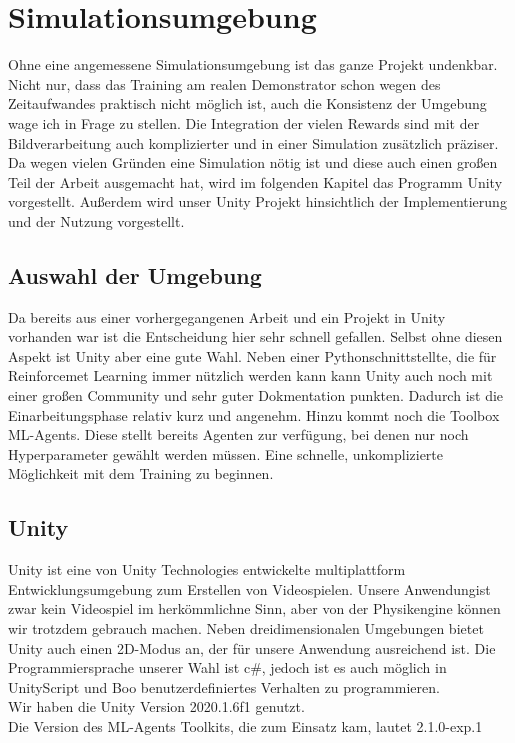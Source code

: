 \chapter{Simulationsumgebung}  
\label{ch:Simulationsumgebung}
Ohne eine angemessene Simulationsumgebung ist das ganze Projekt undenkbar. Nicht nur, dass das Training am realen Demonstrator schon wegen des Zeitaufwandes praktisch nicht möglich ist, auch die Konsistenz der Umgebung wage ich in Frage zu stellen.
Die Integration der vielen Rewards sind mit der Bildverarbeitung auch komplizierter und in einer Simulation zusätzlich präziser.
Da wegen vielen Gründen eine Simulation nötig ist und diese auch einen großen Teil der Arbeit ausgemacht hat, wird im folgenden Kapitel das Programm Unity vorgestellt. Außerdem wird unser Unity Projekt hinsichtlich der Implementierung und der Nutzung vorgestellt.

\section{Auswahl  der Umgebung}
\label{sect:Auswahl  der Umgebung}
Da bereits aus einer vorhergegangenen Arbeit und ein Projekt in Unity vorhanden war ist die Entscheidung hier sehr schnell gefallen.
Selbst ohne diesen Aspekt ist Unity aber eine gute Wahl. Neben einer Pythonschnittstellte, die für Reinforcemet Learning immer nützlich werden kann kann Unity auch noch mit einer großen Community und sehr guter Dokmentation punkten. Dadurch ist die Einarbeitungsphase relativ kurz und angenehm. Hinzu kommt noch die Toolbox ML-Agents. Diese stellt bereits Agenten zur verfügung, bei denen nur noch Hyperparameter gewählt werden müssen.  Eine schnelle, unkomplizierte Möglichkeit mit dem Training zu beginnen.

\section{Unity}
\label{sect:Unity}
Unity ist eine von Unity Technologies entwickelte multiplattform Entwicklungsumgebung zum Erstellen von Videospielen. Unsere Anwendungist zwar kein Videospiel im herkömmlichne Sinn, aber von der Physikengine können wir trotzdem gebrauch machen. Neben dreidimensionalen Umgebungen bietet Unity auch einen 2D-Modus an, der für unsere Anwendung ausreichend ist. Die Programmiersprache unserer Wahl ist c\#, jedoch ist es auch möglich in UnityScript und Boo benutzerdefiniertes Verhalten zu programmieren.\\
Wir haben die Unity Version 2020.1.6f1 genutzt.\\
Die Version des ML-Agents Toolkits, die zum Einsatz kam, lautet 2.1.0-exp.1

